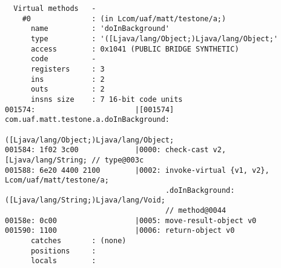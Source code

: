\begin{lstlisting}
  Virtual methods   -
    #0              : (in Lcom/uaf/matt/testone/a;)
      name          : 'doInBackground'
      type          : '([Ljava/lang/Object;)Ljava/lang/Object;'
      access        : 0x1041 (PUBLIC BRIDGE SYNTHETIC)
      code          -
      registers     : 3
      ins           : 2
      outs          : 2
      insns size    : 7 16-bit code units
001574:                       |[001574] com.uaf.matt.testone.a.doInBackground:
                                        ([Ljava/lang/Object;)Ljava/lang/Object;
001584: 1f02 3c00             |0000: check-cast v2, [Ljava/lang/String; // type@003c
001588: 6e20 4400 2100        |0002: invoke-virtual {v1, v2}, Lcom/uaf/matt/testone/a;
                                     .doInBackground:([Ljava/lang/String;)Ljava/lang/Void;
                                     // method@0044
00158e: 0c00                  |0005: move-result-object v0
001590: 1100                  |0006: return-object v0
      catches       : (none)
      positions     :
      locals        :


\end{lstlisting}
